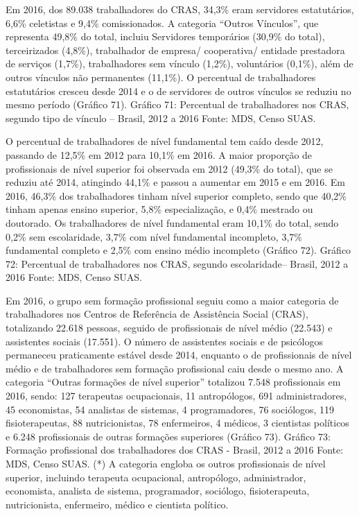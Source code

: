 \documentclass[
  brazilian]{report}
\begin{document}
Em 2016, dos 89.038 trabalhadores do CRAS, 34,3\% eram servidores
estatutários, 6,6\% celetistas e 9,4\% comissionados. A categoria
``Outros Vínculos'', que representa 49,8\% do total, incluiu Servidores
temporários (30,9\% do total), terceirizados (4,8\%), trabalhador de
empresa/ cooperativa/ entidade prestadora de serviços (1,7\%),
trabalhadores sem vínculo (1,2\%), voluntários (0,1\%), além de outros
vínculos não permanentes (11,1\%). O percentual de trabalhadores
estatutários cresceu desde 2014 e o de servidores de outros vínculos se
reduziu no mesmo período (Gráfico 71). Gráfico 71: Percentual de
trabalhadores nos CRAS, segundo tipo de vínculo -- Brasil, 2012 a 2016
Fonte: MDS, Censo SUAS.

O percentual de trabalhadores de nível fundamental tem caído desde 2012,
passando de 12,5\% em 2012 para 10,1\% em 2016. A maior proporção de
profissionais de nível superior foi observada em 2012 (49,3\% do total),
que se reduziu até 2014, atingindo 44,1\% e passou a aumentar em 2015 e
em 2016. Em 2016, 46,3\% dos trabalhadores tinham nível superior
completo, sendo que 40,2\% tinham apenas ensino superior, 5,8\%
especialização, e 0,4\% mestrado ou doutorado. Os trabalhadores de nível
fundamental eram 10,1\% do total, sendo 0,2\% sem escolaridade, 3,7\%
com nível fundamental incompleto, 3,7\% fundamental completo e 2,5\% com
ensino médio incompleto (Gráfico 72). Gráfico 72: Percentual de
trabalhadores nos CRAS, segundo escolaridade-- Brasil, 2012 a 2016
Fonte: MDS, Censo SUAS.

Em 2016, o grupo sem formação profissional seguiu como a maior categoria
de trabalhadores nos Centros de Referência de Assistência Social (CRAS),
totalizando 22.618 pessoas, seguido de profissionais de nível médio
(22.543) e assistentes sociais (17.551). O número de assistentes sociais
e de psicólogos permaneceu praticamente estável desde 2014, enquanto o
de profissionais de nível médio e de trabalhadores sem formação
profissional caiu desde o mesmo ano. A categoria ``Outras formações de
nível superior'' totalizou 7.548 profissionais em 2016, sendo: 127
terapeutas ocupacionais, 11 antropólogos, 691 administradores, 45
economistas, 54 analistas de sistemas, 4 programadores, 76 sociólogos,
119 fisioterapeutas, 88 nutricionistas, 78 enfermeiros, 4 médicos, 3
cientistas políticos e 6.248 profissionais de outras formações
superiores (Gráfico 73). Gráfico 73: Formação profissional dos
trabalhadores dos CRAS - Brasil, 2012 a 2016 Fonte: MDS, Censo SUAS. (*)
A categoria engloba os outros profissionais de nível superior, incluindo
terapeuta ocupacional, antropólogo, administrador, economista, analista
de sistema, programador, sociólogo, fisioterapeuta, nutricionista,
enfermeiro, médico e cientista político.
\end{document}
